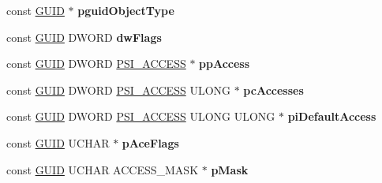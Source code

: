 \begin{DoxyCompactItemize}
\item 
\mbox{\label{structiface_i_security_information_vbtl_aff02df0344f2730f4b6d4890bc39259b}} 
const \hyperlink{interface_g_u_i_d}{G\+U\+ID} $\ast$ {\bfseries pguid\+Object\+Type}
\item 
\mbox{\label{structiface_i_security_information_vbtl_ae1e76205853700f5b15bd8d566f18786}} 
const \hyperlink{interface_g_u_i_d}{G\+U\+ID} D\+W\+O\+RD {\bfseries dw\+Flags}
\item 
\mbox{\label{structiface_i_security_information_vbtl_a942cf5acbe55fbb3b67551d161c595ff}} 
const \hyperlink{interface_g_u_i_d}{G\+U\+ID} D\+W\+O\+RD \hyperlink{struct___s_i___a_c_c_e_s_s}{P\+S\+I\+\_\+\+A\+C\+C\+E\+SS} $\ast$ {\bfseries pp\+Access}
\item 
\mbox{\label{structiface_i_security_information_vbtl_ace3f88b294aacdde33384e96644cc240}} 
const \hyperlink{interface_g_u_i_d}{G\+U\+ID} D\+W\+O\+RD \hyperlink{struct___s_i___a_c_c_e_s_s}{P\+S\+I\+\_\+\+A\+C\+C\+E\+SS} U\+L\+O\+NG $\ast$ {\bfseries pc\+Accesses}
\item 
\mbox{\label{structiface_i_security_information_vbtl_a499d6bfeac21462ee897056bf32bd660}} 
const \hyperlink{interface_g_u_i_d}{G\+U\+ID} D\+W\+O\+RD \hyperlink{struct___s_i___a_c_c_e_s_s}{P\+S\+I\+\_\+\+A\+C\+C\+E\+SS} U\+L\+O\+NG U\+L\+O\+NG $\ast$ {\bfseries pi\+Default\+Access}
\item 
\mbox{\label{structiface_i_security_information_vbtl_ad9491c7dbbcbbd0436dc59460118a7a3}} 
const \hyperlink{interface_g_u_i_d}{G\+U\+ID} U\+C\+H\+AR $\ast$ {\bfseries p\+Ace\+Flags}
\item 
\mbox{\label{structiface_i_security_information_vbtl_afc18b6ea7694911e661e409f6d9507b1}} 
const \hyperlink{interface_g_u_i_d}{G\+U\+ID} U\+C\+H\+AR A\+C\+C\+E\+S\+S\+\_\+\+M\+A\+SK $\ast$ {\bfseries p\+Mask}
\item 
\mbox{\label{structiface_i_security_information_vbtl_a3db73ae015d4db8524c4bc4d968e3ff1}} 

\end{DoxyCompactItemize}
